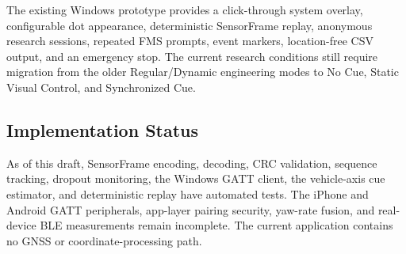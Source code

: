 The existing Windows prototype provides a click-through system overlay, configurable dot appearance, deterministic SensorFrame replay, anonymous research sessions, repeated FMS prompts, event markers, location-free CSV output, and an emergency stop. The current research conditions still require migration from the older Regular/Dynamic engineering modes to No Cue, Static Visual Control, and Synchronized Cue.

\subsection{Implementation Status}

As of this draft, SensorFrame encoding, decoding, CRC validation, sequence tracking, dropout monitoring, the Windows GATT client, the vehicle-axis cue estimator, and deterministic replay have automated tests. The iPhone and Android GATT peripherals, app-layer pairing security, yaw-rate fusion, and real-device BLE measurements remain incomplete. The current application contains no GNSS or coordinate-processing path.
